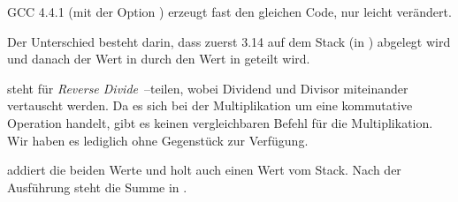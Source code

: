 
GCC 4.4.1 (mit der Option \Othree) erzeugt fast den gleichen Code, nur leicht
verändert.

 Der Unterschied
besteht darin, dass zuerst 3.14 auf dem Stack (in ) abgelegt wird und danach der Wert in  durch den Wert in 
geteilt wird.

\FDIVR steht für \emph{Reverse Divide}~--teilen, wobei Dividend und Divisor
miteinander vertauscht werden. Da es sich bei der Multiplikation um eine
kommutative Operation handelt, gibt es keinen vergleichbaren Befehl für die
Multiplikation. Wir haben es lediglich \FMUL ohne  Gegenstück zur
Verfügung.

\FADDP addiert die beiden Werte und holt auch einen Wert vom Stack. 
Nach der Ausführung steht die Summe in .

